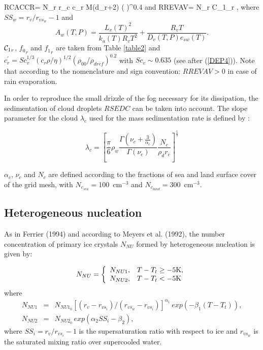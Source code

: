 %
\be\label{WARM2}
RCACCR= N_r r_c c_r M(d_r+2)
\Big(  \Big)^{0.4}
\ee
%
\noindent and
%
\be\label{WARM3}
RREVAV=\dfrac{4\pi}{\rho}  N_r {{\cal C}_1}_r
    ,
\ee
%
\noindent where $SS_w=r_v/r_{vs_{w}}-1$ and
$$
A_{w}(T,P)=\dfrac{L_v(T)^2}{k_a(T) R_v T^2}+\dfrac{R_v T}{D_v(T,P) e_{sw}(T)}.
$$
\noindent ${{\cal C}_1}_r$, ${{f}_0}_r$ and ${{f}_1}_r$ are taken from
Table \ref{table2} and
$c^\prime_r=Sc_{v}^{1/3}(c_r \rho/\eta)^{1/2}(\rho_{00}/\rho_{dref})^{0.2}$ with
$Sc_{v} \sim 0.635$ (see after (\ref{DEP4})). Note that according to the
nomenclature and sign convention: $RREVAV > 0$ in case of rain evaporation.

In order to reproduce the small drizzle of the fog necessary for its dissipation, the sedimentation of cloud droplets $RSEDC$ can be taken into account. The slope parameter for the cloud $\lambda_c$ used for the mass sedimentation rate is defined by :

$$
\lambda_{c} = \left\lbrack \frac{\pi}{6}\rho_{w}\frac{\Gamma (\nu_{c} + \frac{3}{\alpha_{c}})}{\Gamma (\nu_{c})}\frac{N_{c}}{\rho_{d}r_{c}} \right\rbrack ^{\frac{1}{3}}
$$

\noindent $\alpha_{c}$, $\nu_{c}$ and $N_{c}$ are defined according to the fractions of sea and land surface cover of the grid mesh, with $N_{c_{sea}}=$100~cm$^{-3}$ and $N_{c_{land}}=$300~cm$^{-3}$.
%
\subsection{Heterogeneous nucleation}
%
As in Ferrier (1994) and according to Meyers et al. (1992), the number
concentration of primary ice crystals $N_{NU}$ formed by heterogeneous
nucleation is given by:

\begin{equation}\label{NU1}
  N_{NU}=\left\{ \begin{array}{ll}
                   N_{NU1}, & T-T_t \ge -5{\rm K}, \\
                   N_{NU2}, & T-T_t <   -5{\rm K}  \\
                 \end{array}
         \right.
\end{equation}
\noindent where
\begin{eqnarray}\label{NU2}
N_{NU1} &=& N_{NU1_0} \left[ (r_v-r_{vs_{i}})/(r_{vs_{w}}-r_{vs_{i}})
                     \right]^{\alpha_1} \, exp(-\beta_1(T-T_t)), \\
N_{NU2} &=& N_{NU2_0} \, exp(\alpha_2 SS_i - \beta_2),
\end{eqnarray}
\noindent where $SS_i=r_v/r_{vs_{i}}-1$ is the supersaturation ratio with
respect to ice and $r_{vs_{w}}$ is the saturated mixing ratio over supercooled
water.

